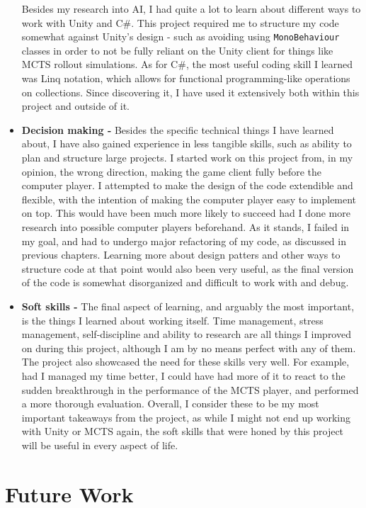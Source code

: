 \begin{itemize}
Besides my research into AI, I had quite a lot to learn about different ways to work with Unity and C\#. This project required me to structure my code somewhat against Unity's design - such as avoiding using \texttt{MonoBehaviour} classes in order to not be fully reliant on the Unity client for things like MCTS rollout simulations. As for C\#, the most useful coding skill I learned was Linq notation, which allows for functional programming-like operations on collections. Since discovering it, I have used it extensively both within this project and outside of it.
\item \textbf{Decision making - } Besides the specific technical things I have learned about, I have also gained experience in less tangible skills, such as ability to plan and structure large projects. I started work on this project from, in my opinion, the wrong direction, making the game client fully before the computer player. I attempted to make the design of the code extendible and flexible, with the intention of making the computer player easy to implement on top. This would have been much more likely to succeed had I done more research into possible computer players beforehand. As it stands, I failed in my goal, and had to undergo major refactoring of my code, as discussed in previous chapters. Learning more about design patters and other ways to structure code at that point would also been very useful, as the final version of the code is somewhat disorganized and difficult to work with and debug.
\item \textbf{Soft skills - } The final aspect of learning, and arguably the most important, is the things I learned about working itself. Time management, stress management, self-discipline and ability to research are all things I improved on during this project, although I am by no means perfect with any of them. The project also showcased the need for these skills very well. For example, had I managed my time better, I could have had more of it to react to the sudden breakthrough in the performance of the MCTS player, and performed a more thorough evaluation. Overall, I consider these to be my most important takeaways from the project, as while I might not end up working with Unity or MCTS again, the soft skills that were honed by this project will be useful in every aspect of life.
\end{itemize}

\section{Future Work}
\label{futureWork}

